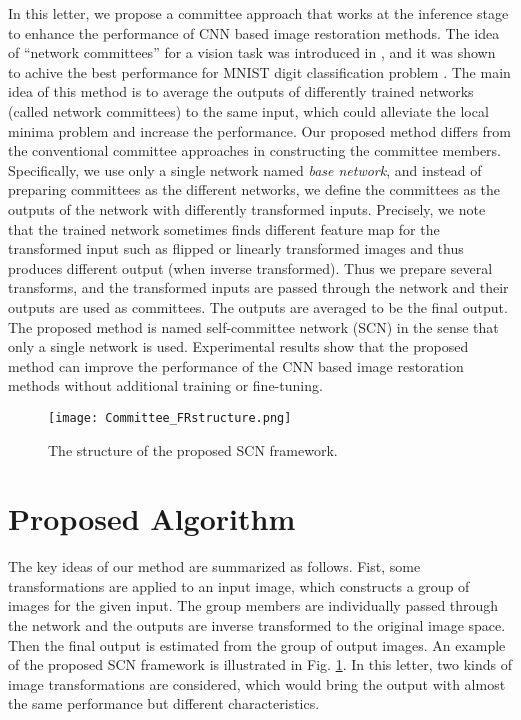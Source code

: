 \documentclass[journal]{IEEEtran}
\begin{document}
In this letter, we propose a committee approach that works at the
inference stage to enhance the performance of CNN based image 
restoration methods. The idea of ``network committees'' for a vision task was introduced in \cite{ciregan2012multi,ciresan2011convolutional}, and it was shown to
achive the best performance for  
MNIST digit classification problem \cite{lecun1998mnist}. 
The main idea of this method is to 
average the outputs of differently trained networks (called
network committees) to the same input,
which could alleviate the local minima problem and increase the performance. 
Our proposed method differs from the conventional committee approaches 
in constructing the committee members. 
Specifically, we use only a single network named \textit{base network},
and instead of preparing committees  
as the different networks, we define the committees as the outputs
of the network with differently transformed inputs.
Precisely, we note that the trained network
sometimes finds different feature map for the transformed input such 
as flipped or linearly transformed images and thus
produces different output (when inverse transformed). Thus 
we prepare several transforms, and the transformed inputs are passed
through the network and their outputs are used as committees. 
The outputs are averaged to be the final output. The proposed 
method is named self-committee network (SCN) in the sense that only
a single network is used. Experimental 
results show that the proposed method can improve the performance of the 
CNN based image restoration methods without additional training 
or fine-tuning. 
 
\begin{figure}
	\centering
	\texttt{[image: Committee\_FRstructure.png]}\\
	\caption{The structure of the proposed SCN framework.}
	\label{fig:Committee_Formulation}
\end{figure} 

\section{Proposed Algorithm}

The key ideas of our method are summarized as follows. Fist, some transformations 
are applied to an input image, which constructs a group of images for the given input. 
The group members are individually passed through the network and the outputs 
are inverse transformed to the original image space. Then the final output is 
estimated from the group of output images. An example of the proposed SCN 
framework is illustrated in Fig. \ref{fig:Committee_Formulation}.
In this letter, two kinds of image transformations are considered, which would
bring the output with almost the same performance but different characteristics.
\end{document}
